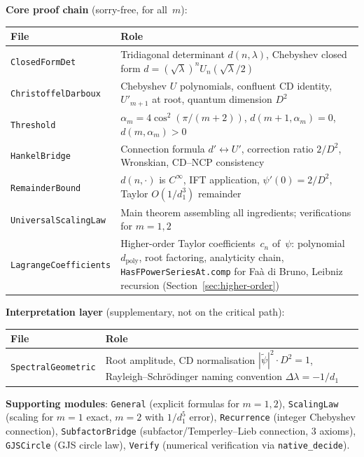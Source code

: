 \documentclass[11pt,a4paper]{article}
\theoremstyle{plain}
\theoremstyle{definition}
\newcommand{\Dsq}{D^2}
\newcommand{\alpham}{\alpha_m}
\newcommand{\chebU}{U}
\newcommand{\lean}[1]{\texttt{#1}}
\begin{document}
\noindent\textbf{Core proof chain} (sorry-free, for all~$m$):

\smallskip
\begin{tabular}{@{}l p{9cm}@{}}
\toprule
\textbf{File} & \textbf{Role} \\
\midrule
\lean{ClosedFormDet} & Tridiagonal determinant $d(n,\lambda)$, Chebyshev
  closed form $d = (\sqrt\lambda)^n \chebU_n(\sqrt\lambda/2)$ \\
\lean{ChristoffelDarboux} & Chebyshev $U$ polynomials, confluent CD identity,
  $\chebU'_{m+1}$ at root, quantum dimension $\Dsq$ \\
\lean{Threshold} & $\alpham = 4\cos^2(\pi/(m{+}2))$,
  $d(m{+}1,\alpham)=0$, $d(m,\alpham)>0$ \\
\lean{HankelBridge} & Connection formula $d' \leftrightarrow \chebU'$,
  correction ratio $2/\Dsq$, Wronskian, CD--NCP consistency \\
\lean{RemainderBound} & $d(n,\cdot)$ is $C^\infty$, IFT application,
  $\psi'(0) = 2/\Dsq$, Taylor $O(1/d_1^3)$ remainder \\
\lean{UniversalScalingLaw} & Main theorem assembling all ingredients;
  verifications for $m=1,2$ \\
\lean{LagrangeCoefficients} & Higher-order Taylor coefficients~$c_n$ of~$\psi$:
  polynomial $d_{\mathrm{poly}}$, root factoring, analyticity chain,
  \lean{HasFPowerSeriesAt.comp} for Fa\`a di Bruno,
  Leibniz recursion (Section~\ref{sec:higher-order}) \\
\bottomrule
\end{tabular}

\medskip

\noindent\textbf{Interpretation layer} (supplementary, not on the
critical path):

\smallskip
\begin{tabular}{@{}l p{9cm}@{}}
\toprule
\textbf{File} & \textbf{Role} \\
\midrule
\lean{SpectralGeometric} & Root amplitude, CD normalisation
  $|\tilde\psi|^2 \cdot \Dsq = 1$, Rayleigh--Schr\"odinger
  naming convention $\Delta\lambda = -1/d_1$ \\
\bottomrule
\end{tabular}

\medskip

\noindent\textbf{Supporting modules}: \lean{General} (explicit formulas
for $m=1,2$), \lean{ScalingLaw} (scaling for $m=1$ exact, $m=2$ with
$1/d_1^5$ error), \lean{Recurrence} (integer Chebyshev connection),
\lean{SubfactorBridge} (subfactor/Temperley--Lieb connection, 3 axioms),
\lean{GJSCircle} (GJS circle law), \lean{Verify} (numerical verification
via \lean{native\_decide}).
\end{document}
